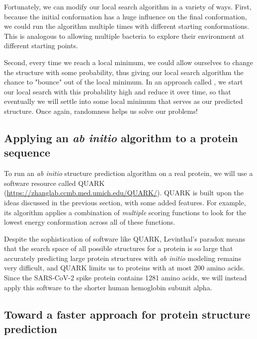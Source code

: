 {{\begin{qbox}\end{qbox}

Fortunately, we can modify our local search algorithm in a variety of ways. First, because the initial conformation has a huge influence on the final conformation, we could run the algorithm multiple times with different starting conformations. This is analogous to allowing multiple bacteria to explore their environment at different starting points.

Second, every time we reach a local minimum, we could allow ourselves to change the structure with some probability, thus giving our local search algorithm the chance to "bounce" out of the local minimum. In an approach called , we start our local search with this probability high and reduce it over time, so that eventually we will settle into some local minimum that serves as our predicted structure. Once again, randomness helps us solve our problems!

\FloatBarrier
{}
\subsection{Applying an \textit{ab initio} algorithm to a protein sequence}

To run an \textit{ab initio} structure prediction algorithm on a real protein, we will use a software resource called QUARK (\url{https://zhanglab.ccmb.med.umich.edu/QUARK/}). QUARK is built upon the ideas discussed in the previous section, with some added features. For example, its algorithm applies a combination of \textit{multiple} scoring functions to look for the lowest energy conformation across all of these functions.

Despite the sophistication of software like QUARK, Levinthal's paradox means that the search space of all possible structures for a protein is so large that accurately predicting large protein structures with \textit{ab initio} modeling remains very difficult, and QUARK limits us to proteins with at most 200 amino acids. Since the SARS-CoV-2 spike protein contains 1281 amino acids, we will instead apply this software to the shorter human hemoglobin subunit alpha. 

\FloatBarrier
{}
\subsection{Toward a faster approach for protein structure prediction}

}}
